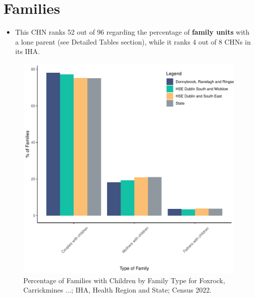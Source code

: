 \documentclass{article}
\begin{document}
\section{Families}\label{sect:Fam}
\begin{itemize}
\item This CHN ranks  52 out of 96 regarding the percentage of \textbf{family units} with a lone parent (see Detailed Tables section), while it ranks   4 out of 8 CHNs in its IHA.
\end{itemize}
\begin{figure}[H]
	\centering
	\includegraphics[width = 150mm]{../figures/FamED.pdf}
	\caption{Percentage of Families with Children by Family Type for Foxrock, Carrickmines ...; IHA, Health Region and State; Census 2022.}
	\label{fig:vbnv}
	\end{figure}
	
\end{document}
